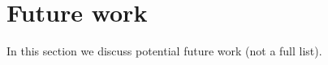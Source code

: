 \section{Future work}\label{sec:futurework}
In this section we discuss potential future work (not a full list).
\begin{comment}
\subsection{Encapsulation}
The biggest limitation of our approach is the inability to model visibility restrictions. For example, the absence
of support for private/protected methods in Java 8 interfaces forces all
members of interfaces to be public, including static methods. Since we use
abstract methods to encode state, our state is always all public. Still, because 
the state can only be accessed by methods, it 
is impossible for the user to know if a certain method maps directly to a field
or if it has a default implementation.  If the user wants a constructor that
does not directly maps to the fields, (as for secondary constructors in Scala)
he can simply define its own \Q@of@ method and delegate on the generated one:
\begin{lstlisting}
@Obj interface Point{  int x(); int y();
  static Point of(int val){return Point.of(val,val);}  }
\end{lstlisting}
However, the generated \Q@of@ method would also be present and public.  If a
future version of Java was to support \emph{static private methods in
  interfaces} we could extend our code generation to handle also encapsulation.
  
However, interfaces as a whole can have public or 
package private (java default) visibility.

We can add a second annotation \Q!@Exposed!  that leverages on this edge: An
interface without exposed works as usual, but if any method of a public \mixin
interface is annotated with \Q!@Exposed!, we can apply a translation where a new
(package private) interface type is introduced, and the original interface become
just a facade.  For example:
\begin{lstlisting}
@Obj public interface Person{
  void name(String val);
  @Exposed default void rename(String newName){ if(/*valid name*/){ this.name(val);}}
  @Exposed String name();
  @Exposed static Person from(String val){ if(/*valid name*/){return Person.of(val);}
    throw /*invalid name*/}  }
\end{lstlisting}
becomes
\begin{lstlisting}
public interface Person{
  void rename(String newName)
  String name();
  static Person from(String val){ return Person$.from(val);} }
  

\end{comment}
